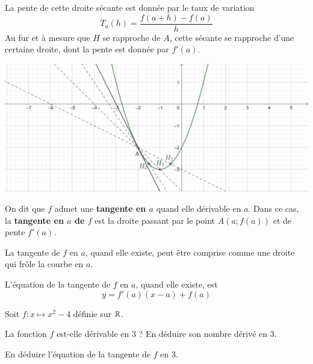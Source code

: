 \documentclass{poly}
\begin{document}
\begin{remark}
La pente de cette droite sécante est donnée par le taux de variation
\begin{equation*}
T_a(h) = \dfrac{f(a + h) - f(a)}{h}
\end{equation*}
Au fur et à mesure que $H$ se rapproche de $A$, cette sécante se rapproche d'une certaine droite, dont la pente est donnée par $f'(a)$.
\begin{center}
\includegraphics[width=\textwidth]{Limite_tangente.png}
\end{center}
\end{remark}
\begin{tcolorbox}
\begin{definition}
On dit que $f$ admet une \textbf{tangente en $a$} quand elle dérivable en $a$. Dans ce cas, la \textbf{tangente en $a$ de $f$} est la droite passant par le point $A(a;f(a))$ et de pente $f'(a)$.
\end{definition}
\end{tcolorbox}
\begin{remark}
La tangente de $f$ en $a$, quand elle existe, peut être comprise comme une droite qui \og frôle \fg la courbe en $a$.
\end{remark}
\begin{proposition}
L'équation de la tangente de $f$ en $a$, quand elle existe, est
\begin{equation*}
y = f'(a)(x - a) + f(a)
\end{equation*} 
\end{proposition}
\begin{example}
Soit $f \colon x \mapsto x^2 - 4$ définie sur $\mathbb{R}$.
\begin{alphaquestions}
\item La fonction $f$ est-elle dérivable en $3$ ? En déduire son nombre dérivé en $3$.
\item En déduire l'équation de la tangente de $f$ en $3$.
\end{alphaquestions}

\end{example}
\end{document}
